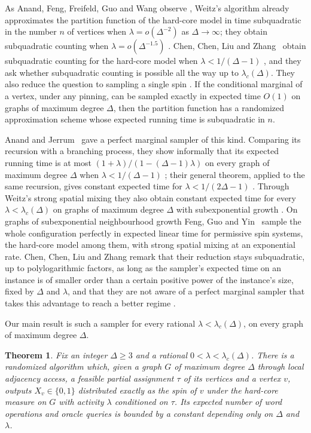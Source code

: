 \documentclass[11pt]{amsart}
\newtheorem{theorem}{Theorem}
\newcommand{\lc}{\lambda_c(\Delta)}
\begin{document}
As Anand, Feng, Freifeld, Guo and Wang observe \cite[Section~1]{AFFGW}, Weitz's algorithm already approximates the partition function of the hard-core model in time subquadratic in the number $n$ of vertices when $\lambda=o(\Delta^{-2})$ as $\Delta\to\infty$; they obtain subquadratic counting when $\lambda=o(\Delta^{-1.5})$ \cite[Theorem~1.1 and Remark~1.2]{AFFGW}. Chen, Chen, Liu and Zhang~\cite{CCLZ} obtain subquadratic counting for the hard-core model when $\lambda<1/(\Delta-1)$ \cite[Theorem~1.1]{CCLZ}, and they ask whether subquadratic counting is possible all the way up to $\lc$. They also reduce the question to sampling a single spin \cite[Theorem~1.4]{CCLZ}. If the conditional marginal of a vertex, under any pinning, can be sampled exactly in expected time $O(1)$ on graphs of maximum degree $\Delta$, then the partition function has a randomized approximation scheme whose expected running time is subquadratic in $n$.

Anand and Jerrum~\cite{AJ22} gave a perfect marginal sampler of this kind. Comparing its recursion with a branching process, they show informally that its expected running time is at most $(1+\lambda)/(1-(\Delta-1)\lambda)$ on every graph of maximum degree $\Delta$ when $\lambda<1/(\Delta-1)$ \cite[Section~3.1]{AJ22}; their general theorem, applied to the same recursion, gives constant expected time for $\lambda<1/(2\Delta-1)$ \cite[Section~6.1]{AJ22}. Through Weitz's strong spatial mixing they also obtain constant expected time for every $\lambda<\lc$ on graphs of maximum degree $\Delta$ with subexponential growth \cite{AJ22}. On graphs of subexponential neighbourhood growth Feng, Guo and Yin~\cite[Theorem~2.4]{FGY} sample the whole configuration perfectly in expected linear time for permissive spin systems, the hard-core model among them, with strong spatial mixing at an exponential rate. Chen, Chen, Liu and Zhang remark that their reduction stays subquadratic, up to polylogarithmic factors, as long as the sampler's expected time on an instance is of smaller order than a certain positive power of the instance's size, fixed by $\Delta$ and $\lambda$, and that they are not aware of a perfect marginal sampler that takes this advantage to reach a better regime \cite[Remark~1.5]{CCLZ}.

Our main result is such a sampler for every rational $\lambda<\lc$, on every graph of maximum degree $\Delta$.

\begin{theorem}\label{thm:main}
Fix an integer $\Delta\ge 3$ and a rational $0<\lambda<\lc$. There is a randomized algorithm which, given a graph $G$ of maximum degree $\Delta$ through local adjacency access, a feasible partial assignment $\tau$ of its vertices and a vertex $v$, outputs $X_v\in\{0,1\}$ distributed exactly as the spin of $v$ under the hard-core measure on $G$ with activity $\lambda$ conditioned on $\tau$. Its expected number of word operations and oracle queries is bounded by a constant depending only on $\Delta$ and $\lambda$.
\end{theorem}
\end{document}
